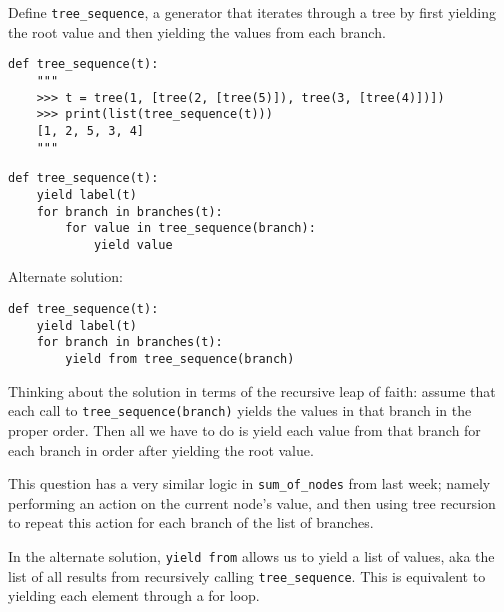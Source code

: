 \begin{blocksection}
\question Define \lstinline$tree_sequence$, a generator that iterates through a tree by first yielding the root value and then yielding the values from each branch.

\begin{lstlisting}
def tree_sequence(t):
    """
    >>> t = tree(1, [tree(2, [tree(5)]), tree(3, [tree(4)])])
    >>> print(list(tree_sequence(t)))
    [1, 2, 5, 3, 4]
    """
\end{lstlisting}

\begin{solution}[1.5in]
\begin{lstlisting}
def tree_sequence(t):
    yield label(t)
    for branch in branches(t):
        for value in tree_sequence(branch):
            yield value
\end{lstlisting}
Alternate solution:
\begin{lstlisting}
def tree_sequence(t):
    yield label(t)
    for branch in branches(t):
        yield from tree_sequence(branch)
\end{lstlisting}
Thinking about the solution in terms of the recursive leap of faith: assume that each call to \lstinline{tree_sequence(branch)} yields the values in that branch in the proper order. Then all we have to do is yield each value from that branch for each branch in order after yielding the root value. 

This question has a very similar logic in \lstinline{sum_of_nodes} from last week; namely performing an action on the current node’s value, and then using tree recursion to repeat this action for each branch of the list of branches.

In the alternate solution, \lstinline{yield from} allows us to yield a list of values, aka the list of all results from recursively calling \lstinline{tree_sequence}. This is equivalent to yielding each element through a for loop.
\end{solution}


\end{blocksection}

